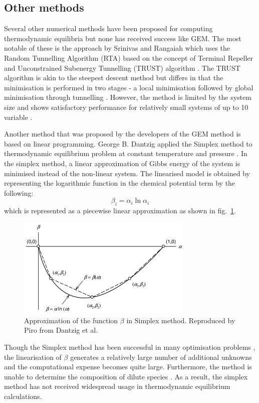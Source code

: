 	\subsection{Other methods}
	Several other numerical methods have been proposed for computing thermodynamic equilibria but none has received success like GEM. The most notable of these is the approach by Srinivas and Rangaiah which uses  the Random Tunnelling Algorithm (RTA) based on the concept of Terminal Repeller and Unconstrained Subenergy Tunnelling (TRUST) algorithm \cite{Srinivas06}. The TRUST algorithm is akin to the steepest descent method but differs in that the minimisation is performed in two stages - a local minimisation followed by global minimisation through tunnelling \cite{Nocedal06}.  However, the method is limited by the system size and shows satisfactory performance for relatively small systems of up to 10 variable \cite{Nocedal06}.

	Another method that was proposed by the developers of the GEM method is based on linear programming. George B. Dantzig applied the Simplex method to thermodynamic equilibrium problem at constant temperature and pressure \cite{Dantzig:1957aa,Dantzig:1958aa}. In the simplex method, a linear approximation of Gibbs energy of the system is minimised instead of the non-linear system. The linearised model is obtained by representing the logarithmic function in the chemical potential term by the following:
	\begin{equation}
		\beta_i = \alpha_i \ln \alpha_i
	\end{equation}
 which is represented as a piecewise linear approximation as shown in fig.~\ref{fig:simplex}.
 	\begin{figure}[htbp]
		\centering
		\includegraphics[width=0.75\textwidth]{figures/Simplex}
		\caption[Approximation of the function $\beta$ in simplex method.]{Approximation of the function $\beta$ in Simplex method. Reproduced by Piro \cite{Piro11b} from Dantzig et al. \cite{Dantzig:1957aa}}
		\label{fig:simplex}
	\end{figure}
	Though the Simplex method has been successful in many optimisation problems \cite{Dantzig:2016aa}, the linearisation of $\beta$ generates a relatively large number of additional unknowns and the computational expense becomes quite large. Furthermore, the method is unable to determine the composition of dilute species \cite{vanZeggeren11}. As a result, the simplex method has not received widespread usage in thermodynamic equilibrium calculations.


